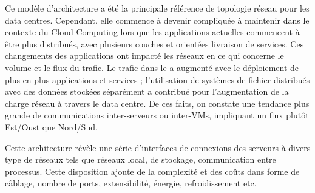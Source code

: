 Ce modèle d'architecture a été la principale référence de topologie réseau pour les data centres. Cependant, elle commence à  devenir compliquée à maintenir dans le contexte du Cloud Computing  lors que les applications actuelles commencent à être plus distribués, avec plusieurs couches et orientées livraison de services. Ces changements des applications ont impacté les réseaux en ce qui concerne le volume et le flux du trafic. Le trafic dans le a augmenté avec le déploiement de plus en plus applications et services ; l'utilisation de systèmes de fichier distribués avec des données stockées séparément a contribué pour l'augmentation de la charge réseau à travers le data centre. De ces faits, on constate une tendance plus grande de communications inter-serveurs ou inter-VMs, impliquant un flux plutôt Est/Oust que Nord/Sud.



Cette architecture révèle une série d'interfaces de connexions des serveurs à divers type de réseaux tels que réseaux local, de stockage, communication entre processus. Cette disposition ajoute de la complexité et des coûts dans forme de câblage, nombre de ports, extensibilité, énergie, refroidissement etc. 




